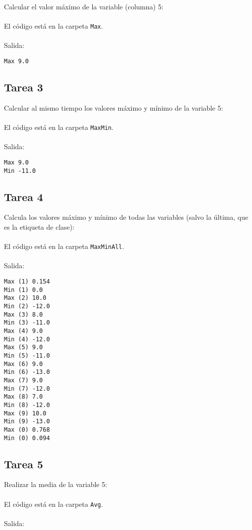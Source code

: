 Calcular el valor máximo de la variable (columna) 5:
\\ \\
El código está en la carpeta \texttt{Max}.
\\ \\
Salida:

\begin{lstlisting}
Max 9.0
\end{lstlisting}

\subsection{Tarea 3}

Calcular al mismo tiempo los valores máximo y mínimo de la variable 5:
\\ \\
El código está en la carpeta \texttt{MaxMin}.
\\ \\
Salida:

\begin{lstlisting}
Max 9.0
Min -11.0
\end{lstlisting}

\subsection{Tarea 4}

Calcula los valores máximo y mínimo de todas las variables (salvo la última, que es la etiqueta de clase):
\\ \\
El código está en la carpeta \texttt{MaxMinAll}.
\\ \\
Salida:

\begin{lstlisting}
Max (1) 0.154
Min (1) 0.0
Max (2) 10.0
Min (2) -12.0
Max (3) 8.0
Min (3) -11.0
Max (4) 9.0
Min (4) -12.0
Max (5) 9.0
Min (5) -11.0
Max (6) 9.0
Min (6) -13.0
Max (7) 9.0
Min (7) -12.0
Max (8) 7.0
Min (8) -12.0
Max (9) 10.0
Min (9) -13.0
Max (0) 0.768
Min (0) 0.094
\end{lstlisting}

\subsection{Tarea 5}

Realizar la media de la variable 5:
\\ \\
El código está en la carpeta \texttt{Avg}.
\\ \\
Salida:


